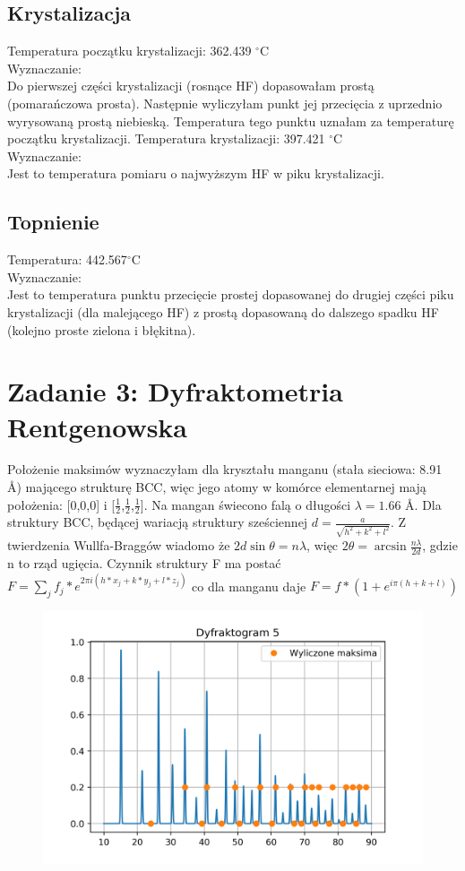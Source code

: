 \documentclass[a4paper,10pt]{article}
\begin{document}
\subsection{Krystalizacja}
Temperatura początku krystalizacji: 362.439 $^\circ$C \\
Wyznaczanie: \\
Do pierwszej części krystalizacji (rosnące HF) dopasowałam prostą (pomarańczowa prosta). Następnie wyliczyłam punkt jej przecięcia z uprzednio wyrysowaną prostą niebieską. Temperatura tego punktu uznałam za temperaturę początku krystalizacji.
Temperatura krystalizacji: 397.421 $^\circ$C \\
Wyznaczanie: \\
Jest to temperatura pomiaru o najwyższym HF w piku krystalizacji.

\subsection{Topnienie}
Temperatura: 442.567$^\circ$C \\
Wyznaczanie: \\
Jest to temperatura punktu przecięcie prostej dopasowanej do drugiej części piku krystalizacji (dla malejącego HF) z prostą dopasowaną do dalszego spadku HF (kolejno proste zielona i błękitna).
 
\section{Zadanie 3: Dyfraktometria Rentgenowska}
Położenie maksimów wyznaczyłam dla kryształu manganu (stała sieciowa: 8.91 \AA) mającego strukturę BCC, więc jego atomy w komórce elementarnej mają położenia: [0,0,0] i [$\frac{1}{2}$,$\frac{1}{2}$,$\frac{1}{2}$].
Na mangan świecono falą o długości $\lambda = 1.66$ \AA. 
Dla struktury BCC, będącej wariacją struktury sześciennej $d=\frac{a}{\sqrt{h^2 +k^2 + l^2}}$. Z twierdzenia Wullfa-Braggów wiadomo że $2 d \sin{\theta} =n\lambda$, więc $2 \theta = \arcsin{\frac{n\lambda} {2 d}} $, gdzie n to rząd ugięcia. Czynnik struktury F ma postać $F=\sum\limits_j f_j * e^{2 \pi i(h*x_j+k*y_j+l*z_j)} $ co dla manganu daje $F=f *( 1+e^{i\pi (h+k+l)}) $ \\

\begin{figure}[H]
	\centering
		\includegraphics[width=\textwidth]{../Dyfraktogram.png}
\end{figure}
\end{document}
